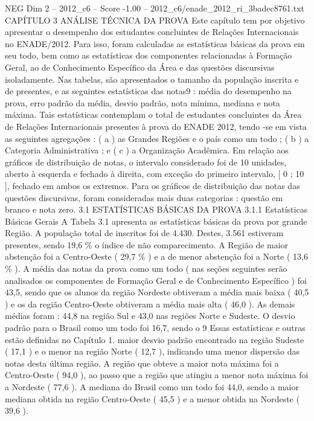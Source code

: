\begin{textsample}{NEG Dim 2 – 2012\_c6 – Score -1.00 – 2012\_c6/enade\_2012\_ri\_3badec8761.txt}  \label{ex:f2_neg_188}
CAPÍTULO 3 ANÁLISE TÉCNICA DA PROVA Este capítulo tem por objetivo apresentar o desempenho dos estudantes concluintes de Relações Internacionais no ENADE/2012.
Para isso, foram calculadas as estatísticas básicas da prova em seu todo, bem como as estatísticas dos componentes relacionadas à Formação Geral, ao de Conhecimento Específico da Área e das questões discursivas isoladamente.
Nas tabelas, são apresentados o tamanho da população inscrita e de presentes, e as seguintes estatísticas das notas9 : média do desempenho na prova, erro padrão da média, desvio padrão, nota mínima, mediana e nota máxima.
Tais estatísticas contemplam o total de estudantes concluintes da Área de Relações Internacionais presentes à prova do ENADE 2012, tendo -se em vista as seguintes agregações : ( a ) as Grandes Regiões e o país como um todo ; ( b ) a Categoria Administrativa ; e ( c ) a Organização Acadêmica.
Em relação aos gráficos de distribuição de notas, o intervalo considerado foi de 10 unidades, aberto à esquerda e fechado à direita, com exceção do primeiro intervalo, [ 0 ; 10 ], fechado em ambos os extremos.
Para os gráficos de distribuição das notas das questões discursivas, foram consideradas mais duas categorias : questão em branco e nota zero. 3.1 ESTATÍSTICAS BÁSICAS DA PROVA 3.1.1 Estatísticas Básicas Gerais A Tabela 3.1 apresenta as estatísticas básicas da prova por grande Região.
A população total de inscritos foi de 4.430.
Destes, 3.561 estiveram presentes, sendo 19,6 \% o índice de não comparecimento.
A Região de maior abstenção foi a Centro-Oeste ( 29,7 \% ) e a de menor abstenção foi a Norte ( 13,6 \% ).
A média das notas da prova como um todo ( nas seções seguintes serão analisados os componentes de Formação Geral e de Conhecimento Específico ) foi 43,5, sendo que os alunos da região Nordeste obtiveram a média mais baixa ( 40,5 ) e os da região Centro-Oeste obtiveram a média mais alta ( 46,0 ).
As demais médias foram : 44,8 na região Sul e 43,0 nas regiões Norte e Sudeste.
O desvio padrão para o Brasil como um todo foi 16,7, sendo o 9 Essas estatísticas e outras estão definidas no Capítulo 1. maior desvio padrão encontrado na região Sudeste ( 17,1 ) e o menor na região Norte ( 12,7 ), indicando uma menor dispersão das notas desta última região.
A região que obteve a maior nota máxima foi a Centro-Oeste ( 94,0 ), ao passo que a região que atingiu a menor nota máxima foi a Nordeste ( 77,6 ).
A mediana do Brasil como um todo foi 44,0, sendo a maior mediana obtida na região Centro-Oeste ( 45,5 ) e a menor obtida na Nordeste ( 39,6 ).

\end{textsample}
